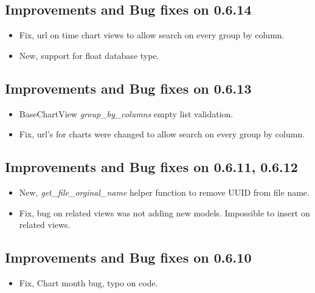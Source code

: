 \documentclass[letterpaper,10pt,english]{sphinxmanual}
\begin{document}
\subsection{Improvements and Bug fixes on 0.6.14}
\label{versions:improvements-and-bug-fixes-on-0-6-14}\begin{itemize}
\item {} 
Fix, url on time chart views to allow search on every group by column.

\item {} 
New, support for float database type.

\end{itemize}


\subsection{Improvements and Bug fixes on 0.6.13}
\label{versions:improvements-and-bug-fixes-on-0-6-13}\begin{itemize}
\item {} 
BaseChartView \emph{group\_by\_columns} empty list validation.

\item {} 
Fix, url's for charts were changed to allow search on every group by column.

\end{itemize}


\subsection{Improvements and Bug fixes on 0.6.11, 0.6.12}
\label{versions:improvements-and-bug-fixes-on-0-6-11-0-6-12}\begin{itemize}
\item {} 
New, \emph{get\_file\_orginal\_name} helper function to remove UUID from file name.

\item {} 
Fix, bug on related views was not adding new models. Impossible to insert on related views.

\end{itemize}


\subsection{Improvements and Bug fixes on 0.6.10}
\label{versions:improvements-and-bug-fixes-on-0-6-10}\begin{itemize}
\item {} 
Fix, Chart month bug, typo on code.

\end{itemize}
\end{document}
